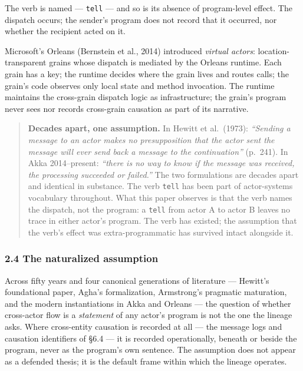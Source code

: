 \documentclass[
]{article}
\let\origtexttt\texttt%
\renewcommand{\texttt}[1]{\origtexttt{\seqsplit{#1}}}%
\let\texttt\origtexttt%
\begin{document}
The verb is named --- \texttt{tell} --- and so is its absence of
program-level effect. The dispatch occurs; the sender's program does not
record that it occurred, nor whether the recipient acted on it.

Microsoft's Orleans (Bernstein et al., 2014) introduced \emph{virtual
actors}: location-transparent grains whose dispatch is mediated by the
Orleans runtime. Each grain has a key; the runtime decides where the
grain lives and routes calls; the grain's code observes only local state
and method invocation. The runtime maintains the cross-grain dispatch
logic as infrastructure; the grain's program never sees nor records
cross-grain causation as part of its narrative.

\begin{quote}
\textbf{Decades apart, one assumption.} In Hewitt et al.~(1973):
\emph{``Sending a message to an actor makes no presupposition that the
actor sent the message will ever send back a message to the
continuation''} (p.~241). In Akka 2014--present: \emph{``there is no way
to know if the message was received, the processing succeeded or
failed.''} The two formulations are decades apart and identical in
substance. The verb \texttt{tell} has been part of actor-systems
vocabulary throughout. What this paper observes is that the verb names
the dispatch, not the program: a \texttt{tell} from actor A to actor B
leaves no trace in either actor's program. The verb has existed; the
assumption that the verb's effect was extra-programmatic has survived
intact alongside it.
\end{quote}

\subsubsection{2.4 The naturalized
assumption}\label{the-naturalized-assumption}

Across fifty years and four canonical generations of literature ---
Hewitt's foundational paper, Agha's formalization, Armstrong's pragmatic
maturation, and the modern instantiations in Akka and Orleans --- the
question of whether cross-actor flow is a \emph{statement} of any
actor's program is not the one the lineage asks. Where cross-entity
causation is recorded at all --- the message logs and causation
identifiers of §6.4 --- it is recorded operationally, beneath or beside
the program, never as the program's own sentence. The assumption does
not appear as a defended thesis; it is the default frame within which
the lineage operates.
\end{document}
